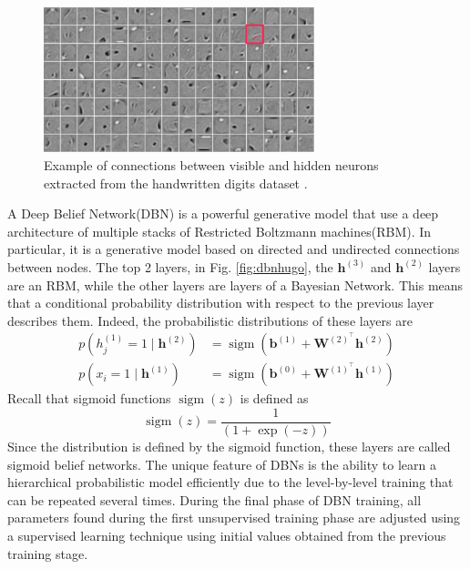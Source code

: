 \begin{figure}
    \centering
    \includegraphics[width=0.7\textwidth]{Images/mnistrbm.png}
    \caption[RBM connection matrixes.]{Example of connections between visible and hidden neurons extracted from the handwritten digits dataset \cite{hugo_larochelle_neural_2013}.}
    \label{fig:minstbrm}
\end{figure}
A Deep Belief Network(DBN) is a powerful generative model that use a deep architecture of multiple stacks of Restricted Boltzmann machines(RBM). In particular, it is a generative model based on directed and undirected connections between nodes. The top 2 layers, in Fig. \ref{fig:dbnhugo}, the $\mathbf{h}^{(3)}$ and $\mathbf{h}^{(2)}$ layers are an RBM, while the other layers are layers of a Bayesian Network. This means that a conditional probability distribution with respect to the previous layer describes them. Indeed, the probabilistic distributions of these layers are
\begin{equation}
\begin{aligned}
p\left(h_j^{(1)}=1 \mid \mathbf{h}^{(2)}\right) & =\operatorname{sigm}\left(\mathbf{b}^{(1)}+\mathbf{W}^{(2)^{\top}} \mathbf{h}^{(2)}\right) \\
p\left(x_i=1 \mid \mathbf{h}^{(1)}\right) & =\operatorname{sigm}\left(\mathbf{b}^{(0)}+\mathbf{W}^{(1)^{\top}} \mathbf{h}^{(1)}\right)
\end{aligned}
\end{equation}
Recall that sigmoid functions $\operatorname{sigm}(z)$ is defined as
\begin{equation}
\operatorname{sigm}(z)=\frac{1}{(1+\exp (-z))}
\end{equation}
Since the distribution is defined by the sigmoid function, these layers are called sigmoid belief networks. The unique feature of DBNs is the ability to learn a hierarchical probabilistic model efficiently due to the level-by-level training that can be repeated several times. During the final phase of DBN training, all parameters found during the first unsupervised training phase are adjusted using a supervised learning technique using initial values obtained from the previous training stage.
